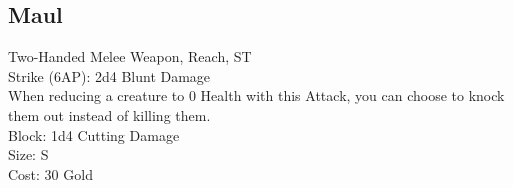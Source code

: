 \subsection{Maul}\label{weapon:maul}
Two-Handed Melee Weapon,  Reach, ST\\
Strike (6AP): 2d4 Blunt Damage\\
When reducing a creature to 0 Health with this Attack, you can choose to knock them out instead of killing them.\\
Block: 1d4 Cutting Damage\\
Size: S\\
Cost: 30 Gold\\